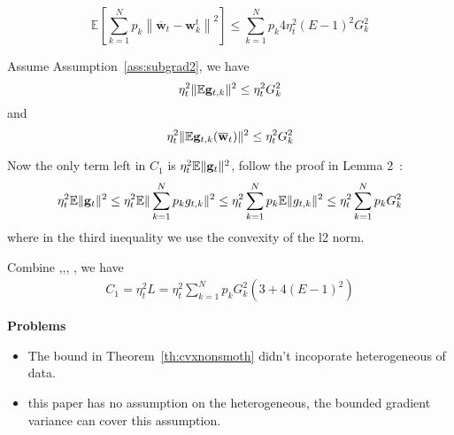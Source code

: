 \begin{equation}
\mathbb{E}\left[\sum_{k=1}^{N} p_{k}\left\|\overline{\mathbf{w}}_{t}-\mathbf{w}_{k}^{t}\right\|^{2}\right] \leq \sum_{k=1}^N p_k4 \eta_{t}^{2}(E-1)^{2} G_k^{2}
	\label{eq:g4}
\end{equation}


Assume Assumption~\ref{ass:subgrad2}, we have 
\begin{equation}
	\eta_t^2 \|\mathbb{E} {\mathbf{g}}_{t,k}\|^2 \leq  \eta_t^2 G_k^2
	\label{eq:g3}
\end{equation}
and
\begin{equation}
	\eta_t^2 \|\mathbb{E} {\mathbf{g}}_{t,k}(\overline{{\mathbf{w}}}_t)\|^2 \leq  \eta_t^2 G_k^2
	\label{eq:g2}
\end{equation}


Now the only term left in $C_1$ is $\eta_{t}^{2} \mathbb{E}\| {\mathbf{g}}_{t} \|^{2} $, follow the proof in Lemma 2~\cite{li2019convergence}: 
\begin{align}
	  \eta_{t}^{2} \mathbb{E}\| {\mathbf{g}}_{t} \|^{2} 
	\leq   \eta_{t}^{2} \mathbb{E}\| \sum_{k=1}^N p_k g_{t,k} \|^{2} 
	\leq   \eta_{t}^{2} \sum_{k=1}^N p_k \mathbb{E}\| g_{t,k} \|^{2} 
	\leq   \eta_{t}^{2} \sum_{k=1}^N p_k G_k^2  \label{eq:g1}
\end{align}
where in the third inequality we use the convexity of the l2 norm.

Combine \eq{\ref{eq:g4}},\eq{\ref{eq:g3}},\eq{\ref{eq:g2}}, \eq{\ref{eq:g1}},
we have 
\begin{align}
C_1 = \eta_t^2 L  = \eta_t^2 \sum_{k=1}^N p_k G_k^2 \left(3 + 4(E-1)^2\right)	
\end{align}


\textbf{Problems}
\begin{itemize}
	\item The bound in Theorem~\ref{th:cvxnonsmoth} didn't incoporate heterogeneous of data.
	\item \cite{huo2020faster} this paper has no assumption on the heterogeneous, the bounded gradient variance can cover this assumption. 
\end{itemize}